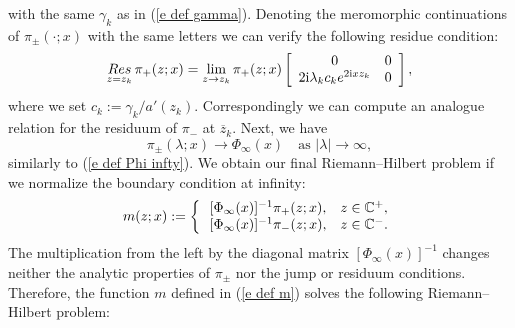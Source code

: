 with the same $\gamma_k$ as in (\ref{e def gamma}). Denoting the meromorphic continuations of $\pi_{\pm}(\cdot;x)$ with the same letters we can verify the following residue condition:
\begin{equation}\label{e res pi}
    \mathop{Res}_{z=z_k}\pi_+(z;x)=\lim_{z\to z_k}\pi_+(z;x)
          \left[
            \begin{array}{cc}
              0 & 0 \\
              2\mathrm{i}\lambda_kc_k e^{2\mathrm{i} xz_k} & 0
            \end{array}
          \right],
\end{equation}
where we set $c_k:=\gamma_k/a'(z_k)$. Correspondingly we can compute an analogue relation for the residuum of $\pi_-$ at $\overline{z}_k$. Next, we have
\begin{equation*}
    \pi_{\pm}(\lambda;x)\to\Phi_{\infty}(x)\quad\text{as }|\lambda|\to\infty,
\end{equation*}
similarly to (\ref{e def Phi infty}).
We obtain our final Riemann--Hilbert problem if we normalize the boundary condition at infinity:
\begin{equation}\label{e def m}
    m(z;x):=
    \left\{
      \begin{array}{ll}
        \,[\Phi_{\infty}(x)]^{-1}\pi_+(z;x), & z\in\mathbb C^+, \\
        \,[\Phi_{\infty}(x)]^{-1}\pi_-(z;x), & z\in\mathbb C^-.
      \end{array}
    \right.
\end{equation}
The multiplication from the left by the diagonal matrix $[\Phi_{\infty}(x)]^{-1}$ changes neither the analytic properties of $\pi_{\pm}$ nor the jump or residuum conditions. Therefore, the function $m$ defined in (\ref{e def m}) solves the following Riemann--Hilbert problem:
